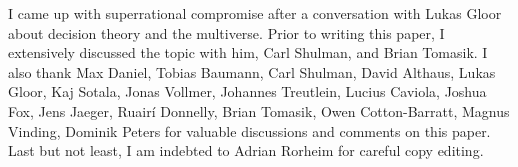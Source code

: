 I came up with superrational compromise after a conversation with Lukas
Gloor about decision theory and the multiverse. Prior to writing this
paper, I extensively discussed the topic with him, Carl Shulman, and
Brian Tomasik. I also thank Max Daniel, Tobias Baumann, Carl Shulman,
David Althaus, Lukas Gloor, Kaj Sotala, Jonas Vollmer, Johannes
Treutlein, Lucius Caviola, Joshua Fox, Jens Jaeger, Ruairí Donnelly,
Brian Tomasik, Owen Cotton-Barratt, Magnus Vinding, Dominik Peters for
valuable discussions and comments on this paper. Last but not least, I
am indebted to Adrian Rorheim for careful copy editing.
